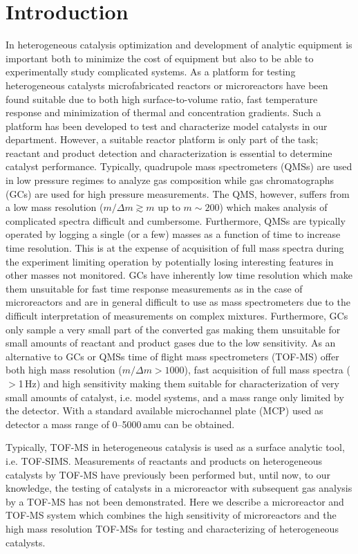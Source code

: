 \documentclass[aip,rsi]{revtex4-1}
\begin{document}
\section{Introduction}
In heterogeneous catalysis optimization and development of analytic equipment is important both to minimize the cost of equipment but also to be able to experimentally study complicated systems. As a platform for testing heterogeneous catalysts microfabricated reactors or microreactors have been found suitable due to both high surface-to-volume ratio, fast temperature response and minimization of thermal and concentration gradients\cite{Jensen2001,Jaehnisch2004}. Such a platform has been developed to test and characterize model catalysts in our department\cite{Henriksen2009}. However, a suitable reactor platform is only part of the task; reactant and product detection and characterization is essential to determine catalyst performance. Typically, quadrupole mass spectrometers (QMSs) are used in low pressure regimes to analyze gas composition while gas chromatographs (GCs) are used for high pressure measurements. The QMS, however, suffers from a low mass resolution ($m/\Delta m\gtrsim m$ up to $m\sim200$) which makes analysis of complicated spectra difficult and cumbersome. Furthermore, QMSs are typically operated by logging a single (or a few) masses as a function of time to increase time resolution. This is at the expense of acquisition of full mass spectra during the experiment limiting operation by potentially losing interesting features in other masses not monitored. GCs have inherently low time resolution which make them unsuitable for fast time response measurements as in the case of microreactors and are in general difficult to use as mass spectrometers due to the difficult interpretation of measurements on complex mixtures. Furthermore, GCs only sample a very small part of the converted gas making them unsuitable for small amounts of reactant and product gases due to the low sensitivity. As an alternative to GCs or QMSs time of flight mass spectrometers (TOF-MS) offer both high mass resolution ($m/\Delta m>1000$), fast acquisition of full mass spectra ($>$1\,Hz) and high sensitivity making them suitable for characterization of very small amounts of catalyst, i.e. model systems, and a mass range only limited by the detector. With a standard available microchannel plate (MCP) used as detector a mass range of \mbox{0--5000}\,amu can be obtained. 

Typically, TOF-MS in heterogeneous catalysis is used as a surface analytic tool, i.e. TOF-SIMS\cite{Benninghoven1994,DeSmet1998,Grams2004,Johnson2010}. Measurements of reactants and products on heterogeneous catalysts by TOF-MS have previously been performed\cite{Levy1963,Okumura2007} but, until now, to our knowledge, the testing of catalysts in a microreactor with subsequent gas analysis by a TOF-MS has not been demonstrated. Here we describe a microreactor and TOF-MS system which combines the high sensitivity of microreactors and the high mass resolution TOF-MSs for testing and characterizing of heterogeneous catalysts.
\end{document}
